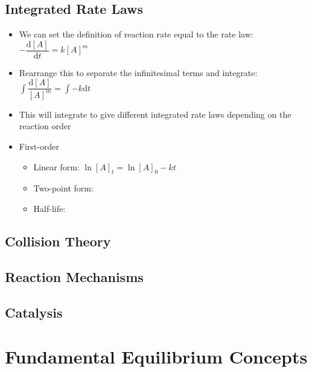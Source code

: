 \documentclass[12pt, openany, letterpaper]{memoir}
\begin{document}
\section{Integrated Rate Laws}
\begin{itemize}
  \item We can set the definition of reaction rate equal to the rate law: $-\dfrac{\mathrm{d}\left[A\right]}{\mathrm{d}t}=k\left[A\right]^m$
  \item Rearrange this to separate the infinitesimal terms and integrate: $\int\dfrac{\mathrm{d}\left[A\right]}{\left[A\right]^m}=\int-k\mathrm{d}t$
  \item This will integrate to give different integrated rate laws depending on the reaction order
  \item First-order
    \begin{itemize}
      \item Linear form: $\ln\left[A\right]_t=\ln\left[A\right]_0-kt$
      \item Two-point form:
      \item Half-life: 
    \end{itemize}
\end{itemize}

\section{Collision Theory}

\section{Reaction Mechanisms}

\section{Catalysis}

\chapter{Fundamental Equilibrium Concepts}
\end{document}

